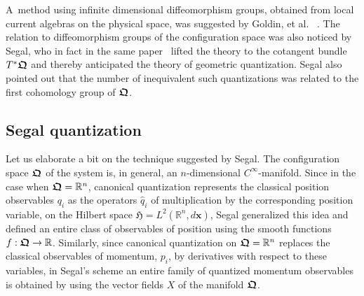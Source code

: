 \documentclass[12pt]{amsart}
\numberwithin{equation}{section}
\theoremstyle{remark}
\newcommand\HH{\mathfrak H}
\newcommand{\bfrakQ}{\mbox{\boldmath $\mathfrak Q$}}
\newcommand{\bx}{\mathbf x}
\begin{document}
A~method using infinite dimensional diffeomorphism groups, obtained from local
current algebras on the physical space, was suggested by
Goldin, et al. ~\cite{bib:gol1,bib:-golmensh2,bib:-golmensh1}.
The relation to diffeomorphism groups of the configuration space was also
noticed by Segal, who in fact in
the same paper~\cite{bib:Segal} lifted the theory to the cotangent bundle
$T^{*}\bfrakQ$ and thereby anticipated the theory of geometric quantization.
Segal also pointed out that the number of inequivalent such
quantizations was related to the first cohomology group of $\bfrakQ$.

\subsection{Segal quantization}\label{subsec-segquant}

Let us elaborate a bit on the technique suggested by Segal. The configuration
space $\bfrakQ$ of the system is, in general, an $n$-dimensional
$C^\infty$-manifold. Since in the case when $\bfrakQ = {\mathbb R}^n$,
canonical quantization represents the classical position observables $q_i$ as
the operators $\widehat{q}_i$ of multiplication by the corresponding position
variable, on the  Hilbert space $\HH = L^2 ({\mathbb R}^n , d\bx )$, Segal
generalized this idea and  defined an entire class of observables of
position  using the smooth functions $f: \bfrakQ \rightarrow {\mathbb R}$.
Similarly, since canonical quantization on $\bfrakQ = {\mathbb R}^n$
replaces the classical observables of momentum, $p_i$, by derivatives with
respect to these variables, in Segal's scheme an entire family of quantized
momentum observables is obtained by using the vector fields $X$ of the manifold
$\bfrakQ$.
\end{document}
